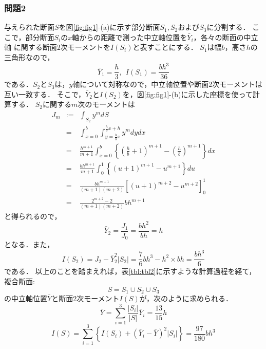 \documentclass[10pt,a4j]{jarticle}
\begin{document}
\subsubsection*{問題2}
与えられた断面$S$を図\ref{fig:fig1}-(a)に示す部分断面$S_1,S_2$および$S_3$に分割する．
ここで，部分断面$S_i$の$x$軸からの距離で測った中立軸位置を$\bar Y_i$，各々の断面の中立軸
に関する断面2次モーメントを$I(S_i)$と表すことにする．
$S_1$は幅$b$，高さ$h$の三角形なので，
\begin{equation}
	\bar Y_1 = \frac{h}{3}, \ \ I(S_1)=\frac{bh^3}{36}
\end{equation}
である．$S_2$と$S_3$は，$y$軸について対称なので，中立軸位置や断面2次モーメントは互い一致する．
そこで，$\bar Y_2$と$I(S_2)$を，図\ref{fig:fig1}-(b)に示した座標を使って計算する．
$S_2$に関する$m$次のモーメントは
\begin{eqnarray}
	J_m 
	&:=& 
	\int_{S_2} y^m dS \\
	&=& 
	\int_{x=0}^b\int_{y=\frac{h}{b}x}^{\frac{h}{b}x+h} y^m dydx \\
	&=& 
	\frac{h^{m+1}}{m+1}
	\int_{x=0}^b 
	\left\{ 
	\left( \frac{h}{b}+1\right)^{m+1} -
	\left( \frac{h}{b}\right)^{m+1} \right\} 
	dx  \\
	&=&
	\frac{bh^{m+1}}{m+1} \int_0^1 \left\{ (u+1)^{m+1}-u^{m+1}\right\}  du \\
	&=&
	\frac{bh^{m+1}}{(m+1)(m+2)} \left[ (u+1)^{m+2}-u^{m+2}\right]_0^1 \\
	&=&
	\frac{2^{m+2}-2}{(m+1)(m+2)}bh^{m+1}
\end{eqnarray}
と得られるので，
\begin{equation}
	\bar Y_2= \frac{J_1}{J_0}=\frac{bh^2}{bh}=h
\end{equation}
となる．また，
\begin{equation}
	I(S_2) =  J_2-\bar Y_2^2 \left| S_2 \right| = \frac{7}{6}bh^3 -h^2\times bh = \frac{bh^3}{6}
\end{equation}
である．
以上のことを踏まえれば，表\ref{tbl:tbl2}に示すような計算過程を経て，複合断面:
\begin{equation}
	S=S_1\cup S_2 \cup S_3
\end{equation}	
の中立軸位置$\bar Y$と断面2次モーメント$I(S)$が，次のように求められる．
\begin{equation}
	\bar Y = \sum_{i=1}^3 \frac{\left|S_i\right|}{\left| S \right|}\bar{Y}_i=\frac{13}{15}h
	\label{eqn:Yb2}
\end{equation}
\begin{equation}
	I(S)=\sum_{i=1}^3\left\{
		I(S_i)+\left( \bar Y_i -\bar Y\right)^2\left| S_i \right|
	\right\}
		=\frac{97}{180}bh^3
	\label{eqn:Iz_2}
\end{equation}
\end{document}
